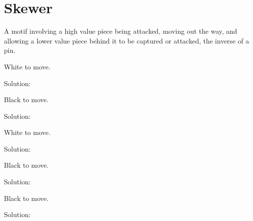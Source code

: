 \documentclass{book}
\begin{document}
\section{Skewer}
A motif involving a high value piece being attacked, moving out the way, and allowing a lower value piece behind it to be captured or attacked, the inverse of a pin.\begin{multicols}{2} 
\begin{samepage} 
\newgame 


 
\showboard
 
 White to move. 
 
Solution: 
 
\end{samepage}\begin{samepage} 
\newgame 


 
\showboard
 
 Black to move. 
 
Solution: 
 
\end{samepage}\begin{samepage} 
\newgame 


 
\showboard
 
 White to move. 
 
Solution: 
 
\end{samepage}\begin{samepage} 
\newgame 


 
\showboard
 
 Black to move. 
 
Solution: 
 
\end{samepage}\begin{samepage} 
\newgame 


 
\showboard
 
 Black to move. 
 
Solution: 
 
\end{samepage}\end{multicols} 
\newpage 
\end{document}
